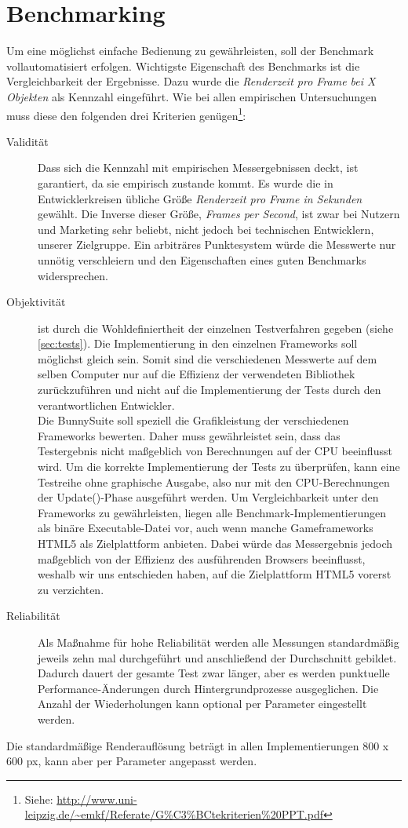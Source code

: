 \section{Benchmarking}
Um eine möglichst einfache Bedienung zu gewährleisten, soll der Benchmark vollautomatisiert erfolgen. Wichtigste Eigenschaft des Benchmarks ist die Vergleichbarkeit der Ergebnisse. Dazu wurde die \textit{Renderzeit pro Frame bei X Objekten} als Kennzahl eingeführt. Wie bei allen empirischen Untersuchungen muss diese den folgenden drei Kriterien genügen\footnote{Siehe: \url{http://www.uni-leipzig.de/~emkf/Referate/G\%C3\%BCtekriterien\%20PPT.pdf}}:\\
\begin{description}
\item[Validität] Dass sich die Kennzahl mit empirischen Messergebnissen deckt, ist garantiert, da sie empirisch zustande kommt. Es wurde die in Entwicklerkreisen übliche Größe {\em Renderzeit pro Frame in Sekunden} gewählt. Die Inverse dieser Größe, {\em Frames per Second}, ist zwar bei Nutzern und Marketing sehr beliebt, nicht jedoch bei technischen Entwicklern, unserer Zielgruppe. Ein arbiträres Punktesystem würde die Messwerte nur unnötig verschleiern und den Eigenschaften eines guten Benchmarks widersprechen.\\

\item[Objektivität] ist durch die Wohldefiniertheit der einzelnen Testverfahren gegeben (siehe \ref{sec:tests}). Die Implementierung in den einzelnen Frameworks soll möglichst gleich sein. Somit sind die verschiedenen Messwerte auf dem selben Computer nur auf die Effizienz der verwendeten Bibliothek zurückzuführen und nicht auf die Implementierung der Tests durch den verantwortlichen Entwickler.\\
Die BunnySuite soll speziell die Grafikleistung der verschiedenen Frameworks bewerten. Daher muss gewährleistet sein, dass das Testergebnis nicht maßgeblich von Berechnungen auf der CPU beeinflusst wird. Um die korrekte Implementierung der Tests zu überprüfen, kann eine Testreihe ohne graphische Ausgabe, also nur mit den CPU-Berechnungen der Update()-Phase ausgeführt werden.
Um Vergleichbarkeit unter den Frameworks zu gewährleisten, liegen alle Benchmark-Implementierungen als binäre Executable-Datei vor, auch wenn manche Gameframeworks HTML5 als Zielplattform anbieten. Dabei würde das Messergebnis jedoch maßgeblich von der Effizienz des ausführenden Browsers beeinflusst, weshalb wir uns entschieden haben, auf die Zielplattform HTML5 vorerst zu verzichten.\\

\item[Reliabilität] Als Maßnahme für hohe Reliabilität werden alle Messungen standardmäßig jeweils zehn mal durchgeführt und anschließend der Durchschnitt gebildet. Dadurch dauert der gesamte Test zwar länger, aber es werden punktuelle Performance-Änderungen durch Hintergrundprozesse ausgeglichen. Die Anzahl der Wiederholungen kann optional per Parameter eingestellt werden.\\
\end{description}
Die standardmäßige Renderauflösung beträgt in allen Implementierungen 800 x 600 px, kann aber per Parameter angepasst werden.

